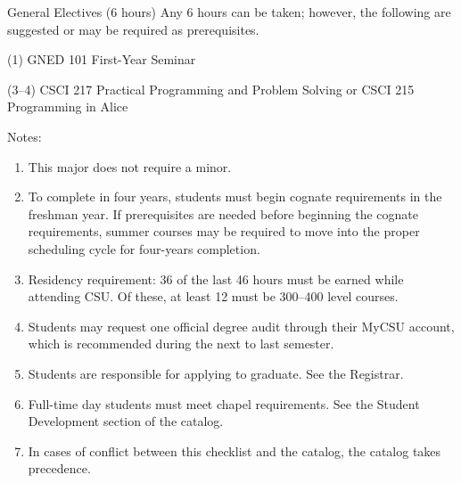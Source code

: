 \begin{reqgroup}{General Electives (6 hours)}
Any 6 hours can be taken; however, the following are suggested or may be required as prerequisites.
\begin{checklist}
\begin{minipage}[t]{\linewidth}
	\item (1)	GNED 101	First-Year Seminar
	\item (3--4)	CSCI 217	Practical Programming and Problem Solving or CSCI 215	Programming in Alice%
		\blankReq{}
\end{minipage}
\end{checklist}
\end{reqgroup}

Notes:%
\begin{enumerate}\footnotesize
	\item This major does not require a minor.
	\item To complete in four years, students must begin cognate requirements in the freshman year. If prerequisites are needed before beginning the cognate requirements, summer courses may be required to move into the proper scheduling cycle for four-years completion.
	\item Residency requirement: 36 of the last 46 hours must be earned while attending CSU. Of these, at least 12 must be 300--400 level courses.
	\item Students may request one official degree audit through their MyCSU account, which is recommended during the next to last semester.
	\item Students are responsible for applying to graduate. See the Registrar.
	\item Full-time day students must meet chapel requirements. See the Student Development section of the catalog.
	\item In cases of conflict between this checklist and the catalog, the catalog takes precedence.
\end{enumerate}

